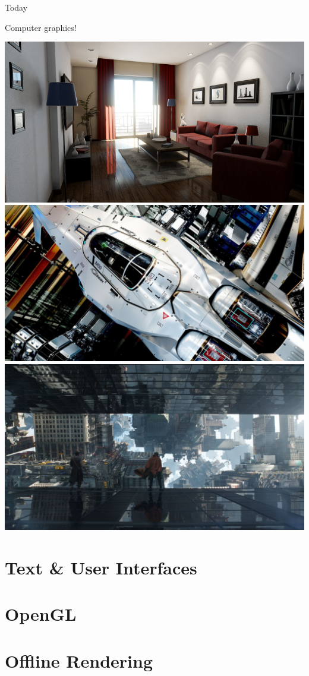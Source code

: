 \documentclass{lug}
\begin{document}
\begin{frame}{Today}
    \noindent
    \begin{minipage}{.65\textwidth}
        Computer graphics!
    \end{minipage}%
    \begin{minipage}{.35\textwidth}
        \includegraphics[width=\textwidth]{graphics/unreal4_damn} \\
        \includegraphics[width=\textwidth]{graphics/star_citizen_pbr} \\
        \includegraphics[width=\textwidth]{graphics/dr_strange}
    \end{minipage}
\end{frame}

\section{Text \& User Interfaces}

\section{OpenGL}

\section{Offline Rendering}
\end{document}
